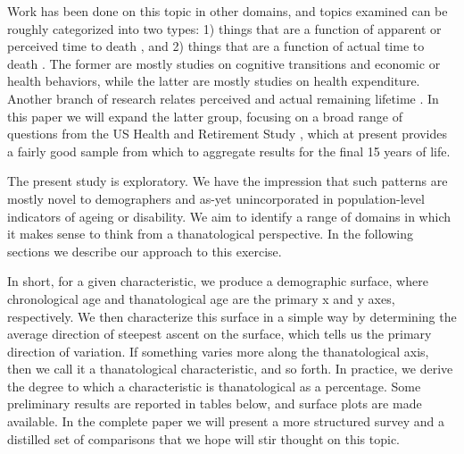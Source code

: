 \documentclass{article}
\begin{document}
Work has been done on this topic in other domains, and
topics examined can be roughly categorized into two types: 1) things that are a
function of apparent or perceived time to death
\citep{hamermesh1985expectations,hurd1995evaluation,carstensen2006influence,gan2004subjective,biro2010subjective,salm2010subjective,van2010living,cocco2012longevity,payne2013life,balia2013survival},
and 2) things that are a function of actual time to death
\citep{miller2001increasing,seshamani2004longitudinal,werblow2007population}.
The former are mostly studies on cognitive transitions and economic or
health behaviors, while the latter are mostly studies on health expenditure.
Another branch of research relates perceived and actual remaining lifetime
\citep{perozek2008using,delavande2011differential,post2012longevity,kutlu2013individuals}.
In this paper we will expand the latter group, focusing on a broad range of questions from the US Health and Retirement Study \citep{HRS}, which at present provides a fairly good sample from which to aggregate results for the final 15 years of life.

The present study is exploratory. We have the impression
that such patterns are mostly novel to demographers and as-yet unincorporated in
population-level indicators of ageing or disability. We aim to identify a
range of domains in which it makes sense to think from a
thanatological perspective. In the following sections we describe our
approach to this exercise. 

In short, for a given characteristic, we produce a
demographic surface, where chronological age and thanatological age are the
primary x and y axes, respectively.
We then characterize this surface in a simple way by determining the average direction of steepest ascent on the surface,
which tells us the primary direction of variation. If something varies more
along the thanatological axis, then we call it a thanatological characteristic,
and so forth. In practice, we derive the degree to which a characteristic is
thanatological as a percentage. Some preliminary results are reported in tables
below, and surface plots are made available.
In the complete paper we will present a more structured survey and a distilled
set of comparisons that we hope will stir thought on this topic.
\end{document}
